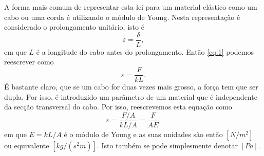 A forma mais comum de representar esta lei para um material elástico como um cabo ou uma corda é utilizando o módulo de Young. Nesta representação é considerado o prolongamento unitário, isto é
\begin{displaymath}
 \varepsilon = \frac{\delta}{L},
\end{displaymath}
em que $L$ é a longitude do cabo antes do prolongamento. Então \eqref{eq:1} podemos reescrever como
\begin{displaymath}
 \varepsilon = \frac{F}{kL}.
\end{displaymath}
É bastante claro, que se um cabo for duas vezes mais grosso, a força tem que ser dupla. Por isso, é introduzido um parâmetro de um material que é independente da secção transversal do cabo. Por isso, reescrevemos esta equação como
\begin{displaymath}
 \varepsilon = \frac{F/A}{kL/A}=\frac{F}{AE}.
\end{displaymath}
em que $E=kL/A$ é o módulo de Young e as suas unidades são então
$[N/m^2]$ ou equivalente $[kg/(s^2m)]$. Isto também se pode simplesmente denotar $[Pa]$. 



